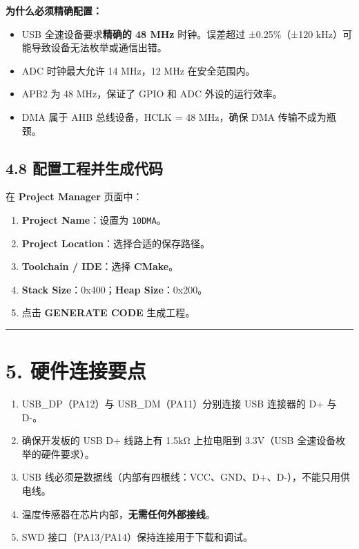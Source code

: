 \documentclass[
  chinese,
  UTF8,
  oneside,
  openany]{ctexbook}
\providecommand{\tightlist}{%
  \setlength{\itemsep}{0pt}\setlength{\parskip}{0pt}}
\begin{document}
\textbf{为什么必须精确配置：}

\begin{itemize}
\tightlist
\item
  USB 全速设备要求\textbf{精确的 48 MHz} 时钟。误差超过 ±0.25\%（±120
  kHz）可能导致设备无法枚举或通信出错。
\item
  ADC 时钟最大允许 14 MHz，12 MHz 在安全范围内。
\item
  APB2 为 48 MHz，保证了 GPIO 和 ADC 外设的运行效率。
\item
  DMA 属于 AHB 总线设备，HCLK = 48 MHz，确保 DMA 传输不成为瓶颈。
\end{itemize}

\subsection{4.8
配置工程并生成代码}\label{ux914dux7f6eux5de5ux7a0bux5e76ux751fux6210ux4ee3ux7801-2}

在 \textbf{Project Manager} 页面中：

\begin{enumerate}
\def\labelenumi{\arabic{enumi}.}
\tightlist
\item
  \textbf{Project Name}：设置为 \texttt{10DMA}。
\item
  \textbf{Project Location}：选择合适的保存路径。
\item
  \textbf{Toolchain / IDE}：选择 \textbf{CMake}。
\item
  \textbf{Stack Size}：0x400；\textbf{Heap Size}：0x200。
\item
  点击 \textbf{GENERATE CODE} 生成工程。
\end{enumerate}

\begin{center}\rule{0.5\linewidth}{0.5pt}\end{center}

\section{5. 硬件连接要点}\label{ux786cux4ef6ux8fdeux63a5ux8981ux70b9-2}

\begin{enumerate}
\def\labelenumi{\arabic{enumi}.}
\tightlist
\item
  USB\_DP（PA12）与 USB\_DM（PA11）分别连接 USB 连接器的 D+ 与 D-。
\item
  确保开发板的 USB D+ 线路上有 1.5kΩ 上拉电阻到 3.3V（USB
  全速设备枚举的硬件要求）。
\item
  USB 线必须是数据线（内部有四根线：VCC、GND、D+、D-），不能只用供电线。
\item
  温度传感器在芯片内部，\textbf{无需任何外部接线}。
\item
  SWD 接口（PA13/PA14）保持连接用于下载和调试。
\end{enumerate}
\end{document}
